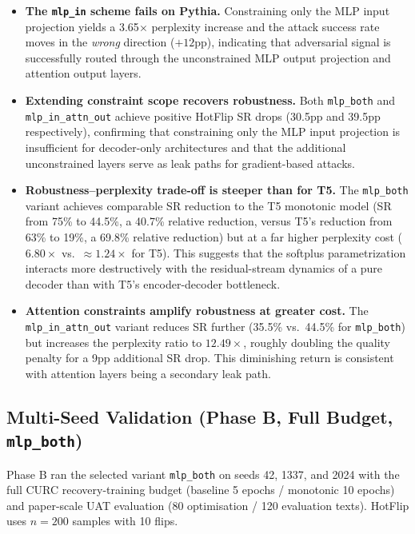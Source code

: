 \documentclass{article}
\begin{document}
\begin{itemize}
    \item \textbf{The \texttt{mlp\_in} scheme fails on Pythia.} Constraining only the MLP input projection yields a 3.65$\times$ perplexity increase and the attack success rate moves in the \emph{wrong} direction ($+12$pp), indicating that adversarial signal is successfully routed through the unconstrained MLP output projection and attention output layers.

    \item \textbf{Extending constraint scope recovers robustness.} Both \texttt{mlp\_both} and \texttt{mlp\_in\_attn\_out} achieve positive HotFlip SR drops (30.5pp and 39.5pp respectively), confirming that constraining only the MLP input projection is insufficient for decoder-only architectures and that the additional unconstrained layers serve as leak paths for gradient-based attacks.

    \item \textbf{Robustness--perplexity trade-off is steeper than for T5.} The \texttt{mlp\_both} variant achieves comparable SR reduction to the T5 monotonic model (SR from 75\% to 44.5\%, a 40.7\% relative reduction, versus T5's reduction from 63\% to 19\%, a 69.8\% relative reduction) but at a far higher perplexity cost ($6.80\times$ vs.\ $\approx 1.24\times$ for T5). This suggests that the softplus parametrization interacts more destructively with the residual-stream dynamics of a pure decoder than with T5's encoder-decoder bottleneck.

    \item \textbf{Attention constraints amplify robustness at greater cost.} The \texttt{mlp\_in\_attn\_out} variant reduces SR further (35.5\% vs.\ 44.5\% for \texttt{mlp\_both}) but increases the perplexity ratio to $12.49\times$, roughly doubling the quality penalty for a 9pp additional SR drop. This diminishing return is consistent with attention layers being a secondary leak path.
\end{itemize}

\subsection{Multi-Seed Validation (Phase B, Full Budget, \texttt{mlp\_both})}

Phase B ran the selected variant \texttt{mlp\_both} on seeds 42, 1337, and 2024 with the full CURC recovery-training budget (baseline 5 epochs / monotonic 10 epochs) and paper-scale UAT evaluation (80 optimisation / 120 evaluation texts). HotFlip uses $n=200$ samples with 10 flips.
\end{document}
